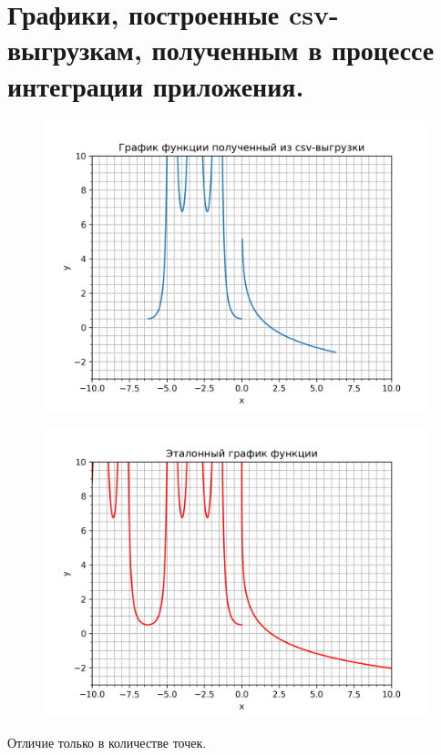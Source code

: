 \documentclass[12pt,onecolumn]{article}
\begin{document}
\section*{Графики, построенные csv-выгрузкам, полученным в процессе интеграции приложения.}
\begin{figure}[H]
    \centering
    \includegraphics[width=\textwidth]{image/myFunc.png}
\end{figure}
\begin{figure}[H]
    \centering
    \includegraphics[width=\textwidth]{image/myFuncIdeal.png}
\end{figure}
Отличие только в количестве точек.
\end{document}
